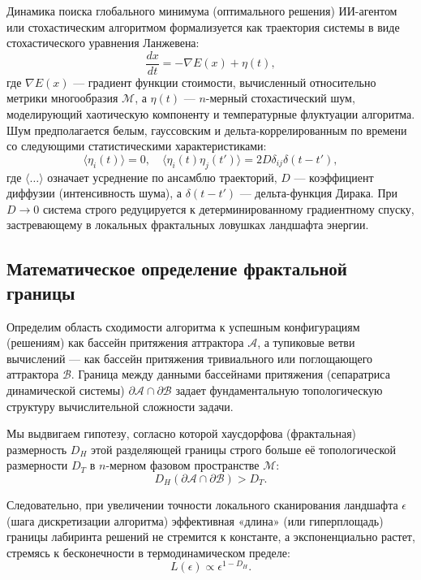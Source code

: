 \documentclass[12pt,a4paper]{article}
\begin{document}
Динамика поиска глобального минимума (оптимального решения) ИИ-агентом или стохастическим алгоритмом формализуется как траектория системы в виде стохастического уравнения Ланжевена:
\begin{equation}
\frac{dx}{dt} = -\nabla E(x) + \eta(t),
\end{equation}
где $\nabla E(x)$ — градиент функции стоимости, вычисленный относительно метрики многообразия $\mathcal{M}$, а $\eta(t)$ — $n$-мерный стохастический шум, моделирующий хаотическую компоненту и температурные флуктуации алгоритма. Шум предполагается белым, гауссовским и дельта-коррелированным по времени со следующими статистическими характеристиками:
\begin{equation}
\langle \eta_i(t) \rangle = 0, \quad \langle \eta_i(t)\eta_j(t') \rangle = 2D\delta_{ij}\delta(t - t'),
\end{equation}
где $\langle \dots \rangle$ означает усреднение по ансамблю траекторий, $D$ — коэффициент диффузии (интенсивность шума), а $\delta(t - t')$ — дельта-функция Дирака. При $D \to 0$ система строго редуцируется к детерминированному градиентному спуску, застревающему в локальных фрактальных ловушках ландшафта энергии.

\subsection{Математическое определение фрактальной границы}

Определим область сходимости алгоритма к успешным конфигурациям (решениям) как бассейн притяжения аттрактора $\mathcal{A}$, а тупиковые ветви вычислений — как бассейн притяжения тривиального или поглощающего аттрактора $\mathcal{B}$. Граница между данными бассейнами притяжения (сепаратриса динамической системы) $\partial\mathcal{A} \cap \partial\mathcal{B}$ задает фундаментальную топологическую структуру вычислительной сложности задачи.

Мы выдвигаем гипотезу, согласно которой хаусдорфова (фрактальная) размерность $D_H$ этой разделяющей границы строго больше её топологической размерности $D_T$ в $n$-мерном фазовом пространстве $\mathcal{M}$:
\begin{equation}
D_H(\partial\mathcal{A} \cap \partial\mathcal{B}) > D_T.
\end{equation}

Следовательно, при увеличении точности локального сканирования ландшафта $\epsilon$ (шага дискретизации алгоритма) эффективная «длина» (или гиперплощадь) границы лабиринта решений не стремится к константе, а экспоненциально растет, стремясь к бесконечности в термодинамическом пределе:
\begin{equation}
L(\epsilon) \propto \epsilon^{1 - D_H}.
\end{equation}
\end{document}
